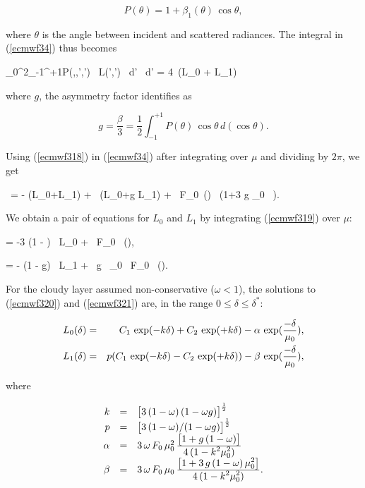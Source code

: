 \medskip
\[
P(\theta) = 1 + \beta_1(\theta) \, \cos\theta,
\]
\medskip

\noindent where $\theta$ is the angle between incident and scattered radiances. The integral in (\ref{ecmwf34}) thus becomes

\medskip
\be
\int_0^{2\pi}\!\!\int_{-1}^{+1}{P(\mu,\phi,\mu',\phi') \, L(\mu',\phi') \, d\mu' \, d\phi'} = 4\pi \, (L_0 + \pi L_1)
\label{ecmwf318}
\ee
\medskip

\noindent where $g$, the asymmetry factor identifies as

\medskip
\[
g = \frac{\beta}{3} = \frac{1}{2} \int_{-1}^{+1}\!{P(\theta) \,\cos\theta \, d(\cos\theta)}.
\]
\medskip

Using (\ref{ecmwf318}) in (\ref{ecmwf34}) after integrating over $\mu$ and dividing by $2\pi$, we get

\medskip
\be
\mu \,  = - (L_0+\mu L_1) + \omega \, (L_0+g \mu L_1) +  \omega \, F_0 \,\exp() \, (1+3 g \mu_0 \, \mu).
\label{ecmwf319}
\ee
\medskip

We obtain a pair of equations for $L_0$ and $L_1$ by integrating (\ref{ecmwf319}) over $\mu$:

\medskip
\be
{} = -3 (1 - \omega) \, L_0 +  \omega \, F_0 \, \exp(),
\label{ecmwf320}
\ee

\be
{} = - (1 - \omega g) \, L_1 +  \omega \, g \, \mu_0 \, F_0 \, \exp().
\label{ecmwf321}
\ee
\medskip

For the cloudy layer assumed non-conservative ($\omega < 1$), the solutions to
(\ref{ecmwf320}) and (\ref{ecmwf321}) are, in the range
$0 \leq \delta \leq \delta^{*}$:

\medskip
\begin{eqnarray}\label{ecmwf322}
L_0(\delta) &=& C_1 \, \exp(-k\delta) + C_2 \, \exp(+k\delta) - \alpha \, \exp(\frac{-\delta}{\mu_0}), \cr
L_1(\delta) &=& p (C_1 \, \exp(-k\delta) - C_2 \, \exp(+k\delta)) - \beta \, \exp(\frac{-\delta}{\mu_0}),
\end{eqnarray}
\medskip

\noindent where

\medskip
$$
\begin{array}{rcl}
k      &=& {\bigl[ 3 \, (1 - \omega) \,  (1 - \omega g)\bigr]}^{\frac{1}{2}}\cr
p      &=& {\bigl[ 3 \, (1 - \omega) / (1 - \omega g)\bigr]}^{\frac{1}{2}}\cr
\alpha &=& 3 \, \omega \, F_0 \, \mu_0^2 \, \frac{\displaystyle{\bigl[ 1 + g \, (1 - \omega) \bigr]}}{\displaystyle{4 \, (1 - k^2 \mu_0^2)}} \cr
\beta  &=& 3 \, \omega \, F_0 \, \mu_0 \, \frac{\displaystyle{\bigl[ 1 + 3 \, g \, (1 - \omega) \, \mu_0^2 \bigr]}}{\displaystyle{4 \, (1 - k^2 \mu_0^2)}}.
\end{array}
$$
\medskip

